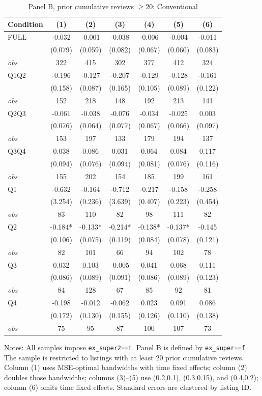 \begin{table}[!htbp]
\centering
\caption{Panel B, prior cumulative reviews $\geq20$: Conventional}
\begin{tabular}{lcccccc}
\toprule
Condition & (1) & (2) & (3) & (4) & (5) & (6) \\
\midrule
FULL & -0.032 & -0.001 & -0.038 & -0.006 & -0.004 & -0.011 \\
 & (0.079) & (0.059) & (0.082) & (0.067) & (0.060) & (0.083) \\
\textit{obs} & 322 & 415 & 302 & 377 & 412 & 324 \\
Q1Q2 & -0.196 & -0.127 & -0.207 & -0.129 & -0.128 & -0.161 \\
 & (0.158) & (0.087) & (0.165) & (0.105) & (0.089) & (0.122) \\
\textit{obs} & 152 & 218 & 148 & 192 & 213 & 141 \\
Q2Q3 & -0.061 & -0.038 & -0.076 & -0.034 & -0.025 & 0.003 \\
 & (0.076) & (0.064) & (0.077) & (0.067) & (0.066) & (0.097) \\
\textit{obs} & 153 & 197 & 133 & 179 & 194 & 137 \\
Q3Q4 & 0.038 & 0.086 & 0.031 & 0.064 & 0.084 & 0.117 \\
 & (0.094) & (0.076) & (0.094) & (0.081) & (0.076) & (0.116) \\
\textit{obs} & 155 & 202 & 154 & 185 & 199 & 161 \\
Q1 & -0.632 & -0.164 & -0.712 & -0.217 & -0.158 & -0.258 \\
 & (3.254) & (0.236) & (3.639) & (0.407) & (0.223) & (0.454) \\
\textit{obs} & 83 & 110 & 82 & 98 & 111 & 82 \\
Q2 & -0.184* & -0.133* & -0.214* & -0.138* & -0.137* & -0.145 \\
 & (0.106) & (0.075) & (0.119) & (0.084) & (0.078) & (0.121) \\
\textit{obs} & 82 & 101 & 66 & 94 & 102 & 78 \\
Q3 & 0.032 & 0.103 & -0.005 & 0.041 & 0.068 & 0.111 \\
 & (0.086) & (0.089) & (0.091) & (0.086) & (0.089) & (0.123) \\
\textit{obs} & 84 & 128 & 67 & 85 & 92 & 81 \\
Q4 & -0.198 & -0.012 & -0.062 & 0.023 & 0.091 & 0.086 \\
 & (0.172) & (0.130) & (0.155) & (0.126) & (0.110) & (0.138) \\
\textit{obs} & 75 & 95 & 87 & 100 & 107 & 73 \\
\bottomrule
\end{tabular}
\begin{minipage}{0.98\textwidth}\footnotesize
Notes: All samples impose \texttt{ex\_super2==t}. Panel B is defined by \texttt{ex\_super==f}. The sample is restricted to listings with at least 20 prior cumulative reviews. Column (1) uses MSE-optimal bandwidths with time fixed effects; column (2) doubles those bandwidths; columns (3)--(5) use (0.2,0.1), (0.3,0.15), and (0.4,0.2); column (6) omits time fixed effects. Standard errors are clustered by listing ID.
\end{minipage}
\end{table}

